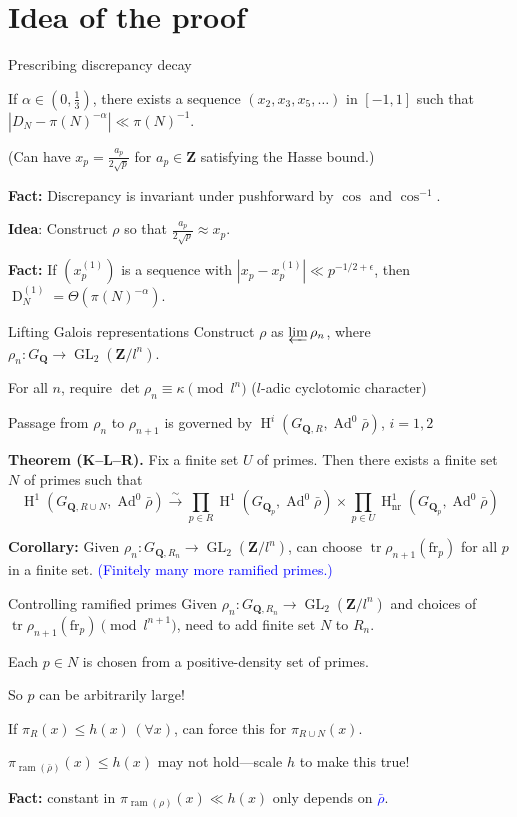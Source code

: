 \documentclass[handout]{beamer}
\DeclareMathOperator{\Ad}{Ad}
\DeclareMathOperator{\D}{D}
\DeclareMathOperator{\GL}{GL}
\DeclareMathOperator{\h}{H}
\DeclareMathOperator{\ram}{ram}
\DeclareMathOperator{\tr}{tr}
\newcommand{\bQ}{\mathbf{Q}}
\newcommand{\bZ}{\mathbf{Z}}
\newcommand{\frob}{\mathrm{fr}}
\begin{document}
\section{Idea of the proof}


\begin{frame}{Prescribing discrepancy decay}
\begin{theorem}
If $\alpha\in \left(0,\frac 1 3\right)$, there exists a sequence 
$(x_2,x_3,x_5,\dots)$ in $[-1,1]$ such that 
$| D_N - \pi(N)^{-\alpha}| \ll \pi(N)^{-1}$. 
\end{theorem}
\pause

(Can have $x_p = \frac{a_p}{2\sqrt p}$ for $a_p\in \bZ$ satisfying the 
Hasse bound.) 
\pause

\textbf{Fact:} 
Discrepancy is invariant under pushforward by $\cos$ and $\cos^{-1}$. 
\pause

\textbf{Idea}:
Construct $\rho$ so that $\frac{a_p}{2\sqrt p}\approx x_p$. 
\pause

\textbf{Fact:} 
If $(x_p^{(1)})$ is a sequence with $|x_p - x_p^{(1)}| \ll p^{-1/2+\epsilon}$, 
then $\D_N^{(1)} = \Theta(\pi(N)^{-\alpha})$. 
\end{frame}


\begin{frame}{Lifting Galois representations}
Construct $\rho$ as $\varprojlim \rho_n$, where 
$\rho_n\colon G_\bQ \to \GL_2(\bZ/l^n)$.
\pause

For all $n$, require $\det\rho_n \equiv \kappa\pmod{l^n}$
\pause
($l$-adic cyclotomic character)
\pause

Passage from $\rho_n$ to $\rho_{n+1}$ is governed by 
$\h^i(G_{\bQ,R},\Ad^0\bar\rho)$, $i = 1,2$
\pause

\textbf{Theorem (K--L--R).}
Fix a finite set $U$ of primes. Then there exists a finite set $N$ of primes 
such that 
\[
	\h^1(G_{\bQ,R\cup N},\Ad^0\bar\rho) \xrightarrow{\sim}\prod_{p\in R} \h^1(G_{\bQ_p}, \Ad^0\bar\rho) \times \prod_{p\in U} \h_\mathrm{nr}^1(G_{\bQ_p},\Ad^0\bar\rho)
\]
\pause

\textbf{Corollary:}
Given $\rho_n\colon G_{\bQ,R_n} \to \GL_2(\bZ/l^n)$, can choose 
$\tr\rho_{n+1}(\frob_p)$ for all $p$ in a finite set.
\pause
\textcolor{blue}{(Finitely many more ramified primes.)}
\end{frame}


\begin{frame}{Controlling ramified primes}
Given $\rho_n\colon G_{\bQ,R_n} \to \GL_2(\bZ/l^n)$ and choices of 
$\tr \rho_{n+1}(\frob_p)\pmod{l^{n+1}}$, need to add finite set $N$ to 
$R_n$. 
\pause

Each $p\in N$ is chosen from a positive-density set of primes.
\pause

So $p$ can be arbitrarily large!
\pause

If $\pi_R(x) \leqslant h(x)\,(\forall x)$, can force this for 
$\pi_{R\cup N}(x)$. 
\pause

$\pi_{\ram(\bar\rho)}(x)\leqslant h(x)$ may not hold---scale $h$ to make this 
true!
\pause

\textbf{Fact:} constant in $\pi_{\ram(\rho)}(x) \ll h(x)$ only depends on 
\textcolor{blue}{$\bar\rho$}. 
\end{frame}
\end{document}
